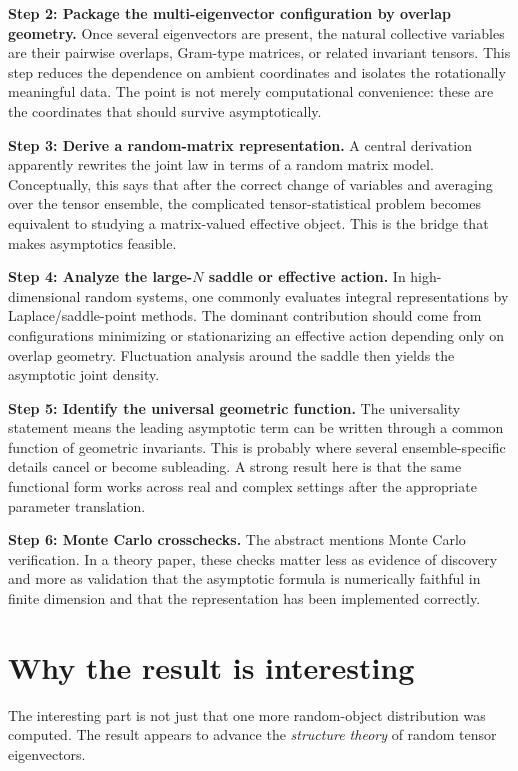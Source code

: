 \documentclass[11pt]{article}
\begin{document}
\textbf{Step 2: Package the multi-eigenvector configuration by overlap geometry.}
Once several eigenvectors are present, the natural collective variables are their pairwise overlaps, Gram-type matrices, or related invariant tensors. This step reduces the dependence on ambient coordinates and isolates the rotationally meaningful data. The point is not merely computational convenience: these are the coordinates that should survive asymptotically.

\textbf{Step 3: Derive a random-matrix representation.}
A central derivation apparently rewrites the joint law in terms of a random matrix model. Conceptually, this says that after the correct change of variables and averaging over the tensor ensemble, the complicated tensor-statistical problem becomes equivalent to studying a matrix-valued effective object. This is the bridge that makes asymptotics feasible.

\textbf{Step 4: Analyze the large-$N$ saddle or effective action.}
In high-dimensional random systems, one commonly evaluates integral representations by Laplace/saddle-point methods. The dominant contribution should come from configurations minimizing or stationarizing an effective action depending only on overlap geometry. Fluctuation analysis around the saddle then yields the asymptotic joint density.

\textbf{Step 5: Identify the universal geometric function.}
The universality statement means the leading asymptotic term can be written through a common function of geometric invariants. This is probably where several ensemble-specific details cancel or become subleading. A strong result here is that the same functional form works across real and complex settings after the appropriate parameter translation.

\textbf{Step 6: Monte Carlo crosschecks.}
The abstract mentions Monte Carlo verification. In a theory paper, these checks matter less as evidence of discovery and more as validation that the asymptotic formula is numerically faithful in finite dimension and that the representation has been implemented correctly.

\section*{Why the result is interesting}
The interesting part is not just that one more random-object distribution was computed. The result appears to advance the \emph{structure theory} of random tensor eigenvectors.
\end{document}

